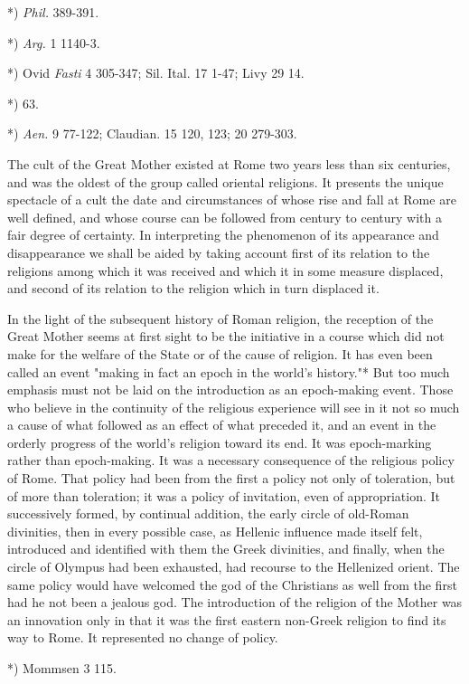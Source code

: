 \documentclass[a4paper, 11pt, oneside, polutonikogreek, english]{article}
\begin{document}
*) \emph{Phil.} 389-391.

*) \emph{Arg.} 1 1140-3.

*) Ovid \emph{Fasti} 4 305-347; Sil. Ital. 17 1-47; Livy 29 14.

*) 63.

*) \emph{Aen.} 9 77-122; Claudian. 15 120, 123; 20 279-303.

The cult of the Great Mother existed at Rome two years less than six centuries, and was the oldest of the group called oriental religions. It presents the unique spectacle of a cult the date and circumstances of whose rise and fall at Rome are well defined, and whose course can be followed from century to century with a fair degree of certainty. In interpreting the phenomenon of its appearance and disappearance we shall be aided by taking account first of its relation to the religions among which it was received and which it in some measure displaced, and second of its relation to the religion which in turn displaced it.

In the light of the subsequent history of Roman religion, the reception of the Great Mother seems at first sight to be the initiative in a course which did not make for the welfare of the State or of the cause of religion. It has even been called an event "making in fact an epoch in the world's history."* But too much emphasis must not be laid on the introduction as an epoch-making event. Those who believe in the continuity of the religious experience will see in it not so much a cause of what followed as an effect of what preceded it, and an event in the orderly progress of the world's religion toward its end. It was epoch-marking rather than epoch-making. It was a necessary consequence of the religious policy of Rome. That policy had been from the first a policy not only of toleration, but of more than toleration; it was a policy of invitation, even of appropriation. It successively formed, by continual addition, the early circle of old-Roman divinities, then in every possible case, as Hellenic influence made itself felt, introduced and identified with them the Greek divinities, and finally, when the circle of Olympus had been exhausted, had recourse to the Hellenized orient. The same policy would have welcomed the god of the Christians as well from the first had he not been a jealous god. The introduction of the religion of the Mother was an innovation only in that it was the first eastern non-Greek religion to find its way to Rome. It represented no change of policy.

*) Mommsen 3 115.
\end{document}
